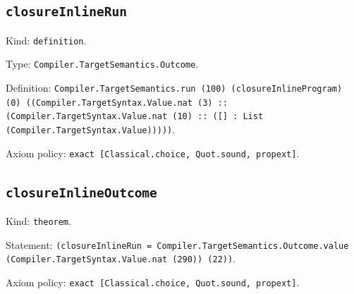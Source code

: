 \documentclass[11pt]{article}
\begin{document}
\subsection*{\texttt{closureInlineRun}}
\noindent Kind: \texttt{definition}.\par
\noindent Type: \texttt{Compiler.TargetSemantics.Outcome}.\par
\noindent Definition: \texttt{Compiler.TargetSemantics.run (100) (closureInlineProgram) (0) ((Compiler.TargetSyntax.Value.nat (3) :: (Compiler.TargetSyntax.Value.nat (10) :: ([] : List (Compiler.TargetSyntax.Value)))))}.\par
\noindent Axiom policy: \texttt{exact [Classical.choice, Quot.sound, propext]}.\par
\subsection*{\texttt{closureInlineOutcome}}
\noindent Kind: \texttt{theorem}.\par
\noindent Statement: \texttt{(closureInlineRun = Compiler.TargetSemantics.Outcome.value (Compiler.TargetSyntax.Value.nat (290)) (22))}.\par
\noindent Axiom policy: \texttt{exact [Classical.choice, Quot.sound, propext]}.\par
\end{document}
